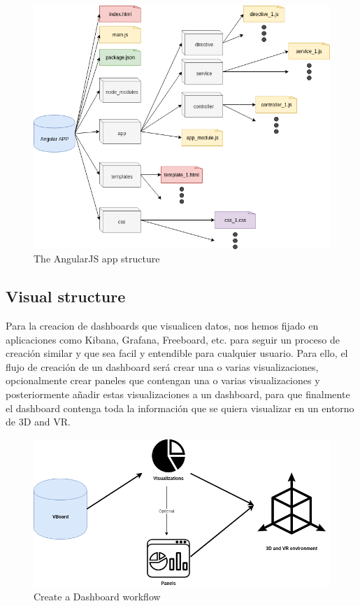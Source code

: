 \documentclass[a4paper, 12pt]{book}
\begin{document}
\begin{figure}[H]
  \centering
  \includegraphics[width=16cm, keepaspectratio]{img/development/Angular_structure}
  \caption{The AngularJS app structure}
  \label{fig:angularjsstructure}
\end{figure}

\subsection{Visual structure}

Para la creacion de dashboards que visualicen datos, nos hemos fijado en aplicaciones como Kibana, Grafana, Freeboard, etc. para seguir un proceso de creación similar y que sea facil y entendible para cualquier usuario. Para ello, el flujo de creación de un dashboard será crear una o varias visualizaciones, opcionalmente crear paneles que contengan una o varias visualizaciones y posteriormente añadir estas visualizaciones a un dashboard, para que finalmente el dashboard contenga toda la información que se quiera visualizar en un entorno de 3D and VR.

\begin{figure}[H]
  \centering
  \includegraphics[width=16cm, keepaspectratio]{img/development/Workflow}
  \caption{Create a Dashboard workflow}
  \label{fig:dashboardworkflow}
\end{figure}
\end{document}
